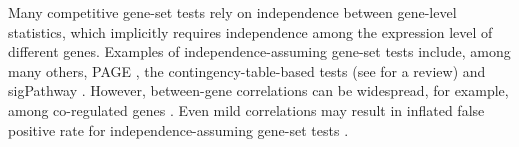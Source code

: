 	Many competitive gene-set tests rely on independence between gene-level statistics, which 
	implicitly requires independence among the expression level of different genes.
	Examples of  independence-assuming gene-set tests include, among many others, PAGE 
	\citep{kim2005page}, the 
	contingency-table-based tests (see \citet{huang2009bioinformatics} 
	for a review) and sigPathway\citep{Smyth2004moderated,tian2005discovering} . 
	However, between-gene correlations can be widespread, for example, among co-regulated genes 
	\citep{gatti2010heading}.  Even mild correlations may result in inflated false 
	positive rate for independence-assuming gene-set tests 
	\citep{efron2007testing,gatti2010heading,goeman2007analyzing, 
		wu2012camera,yaari2013quantitative}.
	
